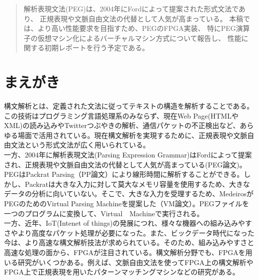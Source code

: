 \documentclass[paper]{ieicej}
\begin{document}
\begin{abstract}
解析表現文法(PEG)は、2004年にFordによって提案された形式文法であり、
正規表現や文脈自由文法の代替として人気が高まっている。
本稿では、より高い性能要求を目指すため、PEGのFPGA実装、
特にPEG演算子の仮想マシン化によるバーチャルマシン方式について報告し、
性能に関する初期レポートを行う予定である。
\end{abstract}
\begin{keyword}
\end{keyword}
\begin{eabstract}
\end{eabstract}
\begin{ekeyword}
\end{ekeyword}
\maketitle

\section{まえがき}

構文解析とは、定義された文法に従ってテキストの構造を解析することである。この技術はプログラミング言語処理系のみならず、現在Web Page(HTMLやXML)の読み込みやTwitterつぶやきの解析、通信パケットの不正検出など、あらゆる場面で活用されている。現在構文解析を実現するために、正規表現や文脈自由文法という形式文法が広く用いられている。\\

一方、2004年に解析表現文法(Parsing Expression Grammar)はFordによって提案され、正規表現や文脈自由文法の代替として人気が高まっている(PEG論文)。PEGはPackrat Parsing（PP論文）により線形時間に解析することができる。しかし、Packratは大きな入力に対して莫大なメモリ容量を使用するため、大きなデータの分析に向いていない。そこで、大きな入力を受理するため、MedeirosがPEGのためのVirtual Parsing Machineを提案した（VM論文）。PEGファイルを一つのプログラムに変換して、Virtual　Machineで実行される。\\

一方、近年、IoT(Intenet of things)の発展につれ、様々な機器への組み込みやすさやより高度なパケット処理が必要になった。また、ビックデータ時代になった今は、より高速な構文解析技法が求められている。そのため、組み込みやすさと高速な処理の面から、FPGAが注目されている。構文解析分野でも、FPGAを用いる研究がいくつかある。例えば、文脈自由文法を使ってFPGA上の構文解析\cite{CFG}やFPGA上で正規表現を用いたパターンマッチングマシン\cite{RE1}などの研究がある。\\
\end{document}
